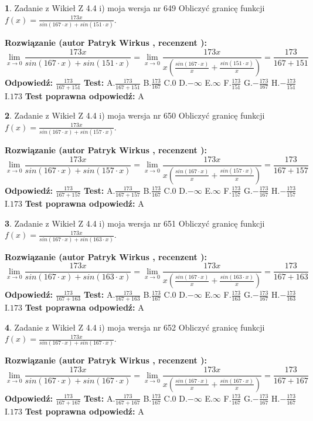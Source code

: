 \documentclass[12pt, a4paper]{article}
\theoremstyle{definition} %
\newtheorem{zad}{}
\newcommand{\zadStart}[1]{\begin{zad}#1\newline}
\newcommand{\zadStop}{\end{zad}}
\newcommand{\rozwStart}[2]{\noindent \textbf{Rozwiązanie (autor #1 , recenzent #2): }\newline}
\newcommand{\rozwStop}{\newline}
\newcommand{\odpStart}{\noindent \textbf{Odpowiedź:}\newline}
\newcommand{\odpStop}{\newline}
\newcommand{\testStart}{\noindent \textbf{Test:}\newline}
\newcommand{\testStop}{\newline}
\newcommand{\kluczStart}{\noindent \textbf{Test poprawna odpowiedź:}\newline}
\newcommand{\kluczStop}{\newline}
\begin{document}
\zadStart{Zadanie z Wikieł Z 4.4 i) moja wersja nr 649}
Obliczyć granicę funkcji $f(x)=\frac{173x}{sin(167\cdot x) +sin(151\cdot x)}$.
\zadStop
\rozwStart{Patryk Wirkus}{}
$$\lim\limits_{x\to 0}\frac{173x}{sin(167\cdot x) +sin(151\cdot x)}=\lim\limits_{x\to 0}\frac{173x}{x(\frac{sin(167\cdot x)}{x}+\frac{sin(151\cdot x)}{x})}=\frac{173}{167+151}$$
\rozwStop
\odpStart
$\frac{173}{167+151}$
\odpStop
\testStart
A.$\frac{173}{167+151}$
B.$\frac{173}{167}$
C.$0$
D.$-\infty$
E.$\infty$
F.$\frac{173}{151}$
G.$-\frac{173}{167}$
H.$-\frac{173}{151}$
I.$173$
\testStop
\kluczStart
A
\kluczStop



\zadStart{Zadanie z Wikieł Z 4.4 i) moja wersja nr 650}
Obliczyć granicę funkcji $f(x)=\frac{173x}{sin(167\cdot x) +sin(157\cdot x)}$.
\zadStop
\rozwStart{Patryk Wirkus}{}
$$\lim\limits_{x\to 0}\frac{173x}{sin(167\cdot x) +sin(157\cdot x)}=\lim\limits_{x\to 0}\frac{173x}{x(\frac{sin(167\cdot x)}{x}+\frac{sin(157\cdot x)}{x})}=\frac{173}{167+157}$$
\rozwStop
\odpStart
$\frac{173}{167+157}$
\odpStop
\testStart
A.$\frac{173}{167+157}$
B.$\frac{173}{167}$
C.$0$
D.$-\infty$
E.$\infty$
F.$\frac{173}{157}$
G.$-\frac{173}{167}$
H.$-\frac{173}{157}$
I.$173$
\testStop
\kluczStart
A
\kluczStop



\zadStart{Zadanie z Wikieł Z 4.4 i) moja wersja nr 651}
Obliczyć granicę funkcji $f(x)=\frac{173x}{sin(167\cdot x) +sin(163\cdot x)}$.
\zadStop
\rozwStart{Patryk Wirkus}{}
$$\lim\limits_{x\to 0}\frac{173x}{sin(167\cdot x) +sin(163\cdot x)}=\lim\limits_{x\to 0}\frac{173x}{x(\frac{sin(167\cdot x)}{x}+\frac{sin(163\cdot x)}{x})}=\frac{173}{167+163}$$
\rozwStop
\odpStart
$\frac{173}{167+163}$
\odpStop
\testStart
A.$\frac{173}{167+163}$
B.$\frac{173}{167}$
C.$0$
D.$-\infty$
E.$\infty$
F.$\frac{173}{163}$
G.$-\frac{173}{167}$
H.$-\frac{173}{163}$
I.$173$
\testStop
\kluczStart
A
\kluczStop



\zadStart{Zadanie z Wikieł Z 4.4 i) moja wersja nr 652}
Obliczyć granicę funkcji $f(x)=\frac{173x}{sin(167\cdot x) +sin(167\cdot x)}$.
\zadStop
\rozwStart{Patryk Wirkus}{}
$$\lim\limits_{x\to 0}\frac{173x}{sin(167\cdot x) +sin(167\cdot x)}=\lim\limits_{x\to 0}\frac{173x}{x(\frac{sin(167\cdot x)}{x}+\frac{sin(167\cdot x)}{x})}=\frac{173}{167+167}$$
\rozwStop
\odpStart
$\frac{173}{167+167}$
\odpStop
\testStart
A.$\frac{173}{167+167}$
B.$\frac{173}{167}$
C.$0$
D.$-\infty$
E.$\infty$
F.$\frac{173}{167}$
G.$-\frac{173}{167}$
H.$-\frac{173}{167}$
I.$173$
\testStop
\kluczStart
A
\kluczStop
\end{document}
